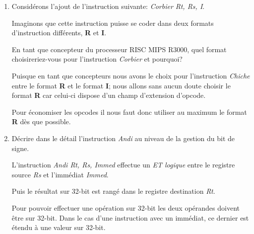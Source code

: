 \begin{enumerate}
    \begin{correction}

      La loi d'Amdhal est utilis\'ee par les concepteurs de microprocesseurs
      pour choisir correctement les instructions \`a inclure dans le
      jeu d'instructions du processeur.

      Cette loi dit que le gain r\'eel li\'e \`a l'inclusion d'une instruction
      est relatif \`a son temps d'ex\'ecution mais \'egalement au
      taux d'utilisation de cette m\^eme instruction.

    \end{correction}
  \item
    Consid\'erons l'ajout de l'instruction suivante:
    \textit{Corbier Rt, Rs, I}.

    Imaginons que cette instruction puisse se coder dans deux formats
    d'instruction diff\'erents, \textbf{R} et \textbf{I}.

    En tant que concepteur du processeur RISC MIPS R3000, quel
    format choisireriez-vous pour l'instruction \textit{Corbier} et pourquoi?

    \begin{correction}

      Puisque en tant que concepteurs nous avons le choix pour l'instruction
      \textit{Chiche} entre le format \textbf{R} et le format \textbf{I};
      nous allons sans aucun doute choisir le format \textbf{R} car celui-ci
      dispose d'un champ d'extension d'opcode.

      Pour \'economiser les opcodes il nous faut donc utiliser au maximum
      le format \textbf{R} d\`es que possible.

    \end{correction}
  \item
    D\'ecrire dans le d\'etail l'instruction \textit{Andi} au niveau de la
    gestion du bit de signe.

    \begin{correction}

      L'instruction \textit{Andi Rt, Rs, Immed} effectue un \textit{ET logique}
      entre le registre source \textit{Rs} et l'imm\'ediat \textit{Immed}.

      Puis le r\'esultat sur 32-bit est rang\'e dans le registre destination
      \textit{Rt}.

      Pour pouvoir effectuer une op\'eration sur 32-bit les deux op\'erandes
      doivent \^etre sur 32-bit. Dans le cas d'une instruction avec
      un imm\'ediat, ce dernier est \'etendu \`a une valeur sur 32-bit.


\end{correction}
\end{enumerate}
